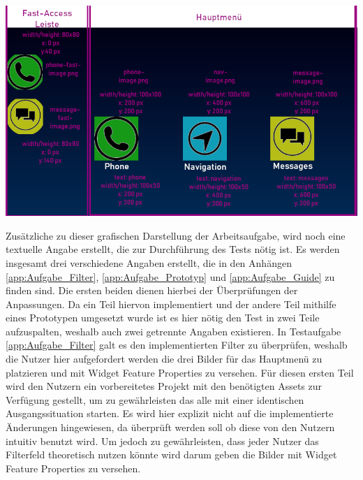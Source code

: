 \begin{center}
  \includegraphics[width=\textwidth]{figures/Styleguide_Rahmen.png}
  \label{fig:Styleguide}
\end{center}

Zusätzliche zu dieser grafischen Darstellung der Arbeitsaufgabe, wird noch eine textuelle Angabe erstellt, die zur Durchführung des Tests nötig ist.
Es werden insgesamt drei verschiedene Angaben erstellt, die in den Anhängen \ref{app:Aufgabe_Filter}, \ref{app:Aufgabe_Prototyp} und \ref{app:Aufgabe_Guide} zu finden sind.
Die ersten beiden dienen hierbei der Überprüfungen der Anpassungen.
Da ein Teil hiervon implementiert und der andere Teil mithilfe eines Prototypen umgesetzt wurde ist es hier nötig den Test in zwei Teile aufzuspalten, weshalb auch zwei getrennte Angaben existieren.
In Testaufgabe \ref{app:Aufgabe_Filter} galt es den implementierten Filter zu überprüfen, weshalb die Nutzer hier aufgefordert werden die drei Bilder für das Hauptmenü zu platzieren und mit Widget Feature Properties zu versehen.
Für diesen ersten Teil wird den Nutzern ein vorbereitetes Projekt mit den benötigten Assets zur Verfügung gestellt, um zu gewährleisten das alle mit einer identischen Ausgangssituation starten.
Es wird hier explizit nicht auf die implementierte Änderungen hingewiesen, da überprüft werden soll ob diese von den Nutzern intuitiv benutzt wird.
Um jedoch zu gewährleisten, dass jeder Nutzer das Filterfeld theoretisch nutzen könnte wird darum geben die Bilder mit Widget Feature Properties zu versehen.

